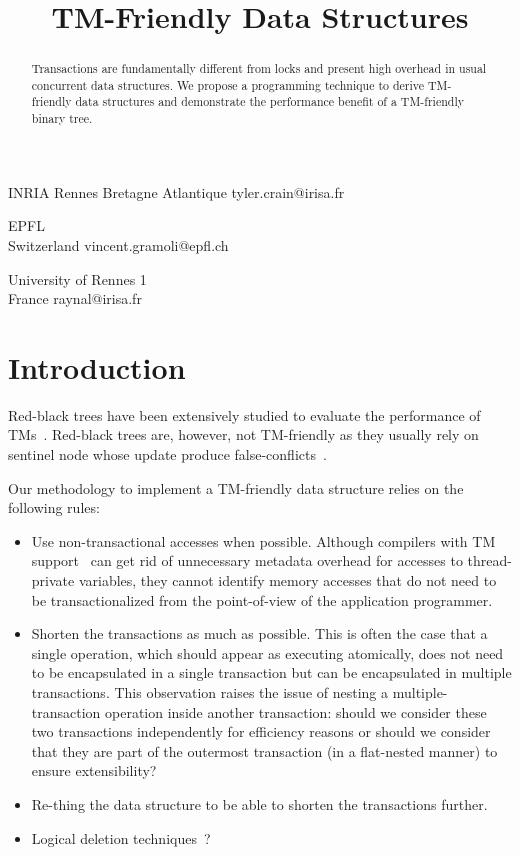 \documentclass[10pt]{sigplanconf}
\begin{document}
\title{TM-Friendly Data Structures}

           {INRIA Rennes Bretagne Atlantique}
           {tyler.crain@irisa.fr}

           {EPFL\\Switzerland}
           {vincent.gramoli@epfl.ch}

           {University of Rennes 1\\France}
           {raynal@irisa.fr}


\newpage

\maketitle

\setcounter{page}{1}

\begin{abstract}
Transactions are fundamentally different from locks and present high overhead in usual concurrent data structures. 
We propose a programming technique to derive TM-friendly data structures and demonstrate the performance benefit of a TM-friendly binary tree.
\end{abstract}

\section{Introduction}

Red-black trees have been extensively studied to evaluate the performance of TMs~\cite{ST95,HLMS03,HK08,FFR08,DFGG11}.
Red-black trees are, however, not TM-friendly as they usually rely on sentinel node whose update produce false-conflicts~\cite{Fra03}.

Our methodology to implement a TM-friendly data structure relies on the following rules:
\begin{itemize}
	\item Use non-transactional accesses when possible. Although compilers with TM support~\cite{dtmc,gcc,icc} can get rid of 
	unnecessary metadata overhead for accesses to thread-private variables, they cannot identify memory accesses that do not need to 
	be transactionalized from the point-of-view of the application programmer.
	\item Shorten the transactions as much as possible. This is often the case that a single operation, which should appear as executing 
	atomically, does not need to be encapsulated in a single transaction but can be encapsulated in multiple transactions. This observation raises the issue
	of nesting a multiple-transaction operation inside another transaction: should we consider these two transactions independently
	for efficiency reasons or should we consider that they are part of the outermost transaction (in a flat-nested manner) to ensure 
	extensibility?
	\item Re-thing the data structure to be able to shorten the transactions further.
	\item Logical deletion techniques~\cite{Har01,Mic02}?
\end{itemize}
\end{document}
